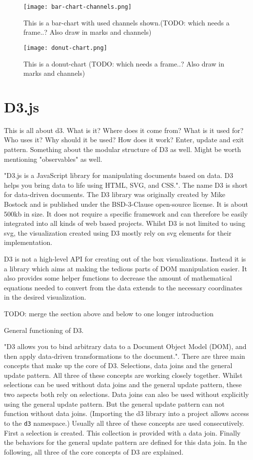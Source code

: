 \begin{figure}
    \label{fig:bar-chart}
    \texttt{[image: bar-chart-channels.png]}
    \caption[bar-chart]{This is a bar-chart with used channels shown.(TODO: which needs a frame..? Also draw in marks and channels)}
\end{figure}

\begin{figure}
    \label{fig:donut-chart}
    \texttt{[image: donut-chart.png]}
    \caption[donut-chart]{This is a donut-chart (TODO: which needs a frame..? Also draw in marks and channels)}
\end{figure}

\section{D3.js}
This is all about d3. What is it? Where does it come from? What is it used for? Who uses it? Why should it be used? How does it work? Enter, update and exit pattern. Something about the modular structure of D3 as well. Might be worth mentioning "observables" as well.

"D3.js is a JavaScript library for manipulating documents based on data. D3 helps you bring data to life using HTML, SVG, and CSS."\cite{d3js}. The name D3 is short for data-driven documents. The D3 library was originally created by Mike Bostock and is published under the BSD-3-Clause open-source license. It is about 500kb in size. It does not require a specific framework and can therefore be easily integrated into all kinds of web based projects. Whilst D3 is not limited to using svg, the visualization created using D3 mostly rely on svg elements for their implementation.

D3 is not a high-level API for creating out of the box visualizations. Instead it is a library which aims at making the tedious parts of DOM manipulation easier. It also provides some helper functions to decrease the amount of mathematical equations needed to convert from the data extends to the necessary coordinates in the desired visualization.

TODO: merge the section above and below to one longer introduction

General functioning of D3.

"D3 allows you to bind arbitrary data to a Document Object Model (DOM), and then apply data-driven transformations to the document."\cite{d3js}. There are three main concepts that make up the core of D3. Selections, data joins and the general update pattern. All three of these concepts are working closely together. Whilst selections can be used without data joins and the general update pattern, these two aspects both rely on selections. Data joins can also be used without explicitly using the general update pattern. But the general update pattern can not function without data joins. (Importing the d3 library into a project allows access to the \verb|d3| namespace.)
Usually all three of these concepts are used consecutively. First a selection is created. This collection is provided with a data join. Finally the behaviors for the general update pattern are defined for this data join.
In the following, all three of the core concepts of D3 are explained.

